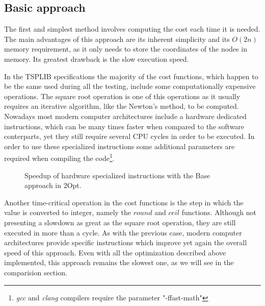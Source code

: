 \subsection{Basic approach}

The first and simplest method involves computing the cost each time it is needed. 
The main advantages of this approach are its inherent simplicity and its $O(2n)$ memory requirement, as it only needs to store the coordinates of the nodes in memory.
Its greatest drawback is the slow execution speed.

In the TSPLIB specifications the majority of the cost functions, which happen to be the same used during all the testing, include some computationally expensive operations.
The square root operation is one of this operations as it usually requires an iterative algorithm, like the Newton's method\cite{newtonMethod}, to be computed.
Nowadays most modern computer architectures include a hardware dedicated instructions, which can be many times faster when compared to the software conterparts, yet they still require several CPU cycles in order to be executed.
In order to use these specialized instructions some additional parameters are required when compiling the code\footnote{\textit{gcc} and \textit{clang} compilers require the parameter "-ffast-math"}.

\begin{figure}[htbp]
    \centering
    \caption{Speedup of hardware specialized instructions with the Base approach in 2Opt.} \label{fig:baseHWSpecific}
\end{figure}

Another time-critical operation in the cost functions is the step in which the value is converted to integer, namely the $round$ and $ceil$ functions.
Although not presenting a slowdown as great as the square root operation, they are still executed in more than a cycle.
As with the previous case, modern computer architectures provide specific instructions which improve yet again the overall speed of this approach.
Even with all the optimization described above implemented, this approach remains the slowest one, as we will see in the comparision section.

